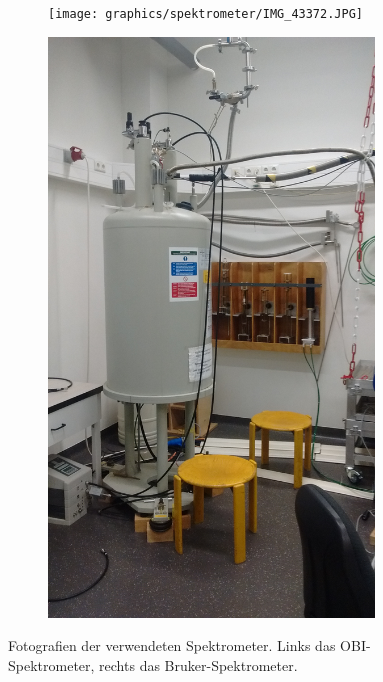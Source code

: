 \begin{figure}
	\centering
	\begin{subfigure}{.35\textwidth}
		\centering
		\texttt{[image: graphics/spektrometer/IMG\_43372.JPG]}
		\caption{ }
		\label{fig:exp:OBI}
	\end{subfigure}%
	\begin{subfigure}{.35\textwidth}
		\centering
		\includegraphics[width=0.95\textwidth]{graphics/spektrometer/IMG_20180419_160711175.jpg}
		\caption{ }
		\label{fig:exp:bruker}
	\end{subfigure}
	\caption{Fotografien der verwendeten Spektrometer. Links das OBI-Spektrometer, rechts das Bruker-Spektrometer.}
	\label{fig:exp:proben}
\end{figure}

